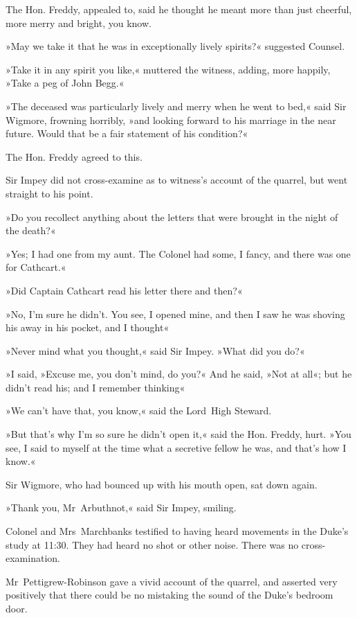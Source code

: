 The Hon. Freddy, appealed to, said he thought he meant more than just cheerful, more merry and bright, you know.

»May we take it that he was in exceptionally lively spirits?« suggested Counsel.

»Take it in any spirit you like,« muttered the witness, adding, more happily, »Take a peg of John Begg.«

»The deceased was particularly lively and merry when he went to bed,« said Sir Wigmore, frowning horribly, »and looking forward to his marriage in the near future. Would that be a fair statement of his condition?«

The Hon. Freddy agreed to this.

Sir Impey did not cross-examine as to witness's account of the quarrel, but went straight to his point.

»Do you recollect anything about the letters that were brought in the night of the death?«

»Yes; I had one from my aunt. The Colonel had some, I fancy, and there was one for Cathcart.«

»Did Captain Cathcart read his letter there and then?«

»No, I'm sure he didn't. You see, I opened mine, and then I saw he was shoving his away in his pocket, and I thought\longdash«

»Never mind what you thought,« said Sir Impey. »What did you do?«

»I said, »Excuse me, you don't mind, do you?« And he said, »Not at all«; but he didn't read his; and I remember thinking\longdash«

»We can't have that, you know,« said the Lord~High Steward.

»But that's why I'm so sure he didn't open it,« said the Hon. Freddy, hurt. »You see, I said to myself at the time what a secretive fellow he was, and that's how I know.«

Sir Wigmore, who had bounced up with his mouth open, sat down again.

»Thank you, Mr~Arbuthnot,« said Sir Impey, smiling.

Colonel and Mrs~Marchbanks testified to having heard movements in the Duke's study at 11:30. They had heard no shot or other noise. There was no cross-examination.

Mr~Pettigrew-Robinson gave a vivid account of the quarrel, and asserted very positively that there could be no mistaking the sound of the Duke's bedroom door.


